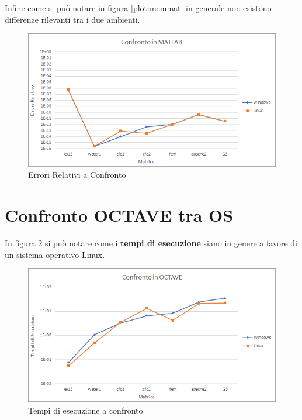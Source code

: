 \documentclass[a4paper,12pt,titlepage,oneside]{book}
\begin{document}
    \newpage
    \noindent Infine come si può notare in figura \ref{plot:memmat} in generale non esistono differenze rilevanti tra i due ambienti.\\[0.5cm]
    
    \begin{figure}[ht]
        \centering
        \includegraphics[scale=0.8]{src/plot/ErrMAT.png}
        \caption{Errori Relativi a Confronto}
        \label{plot:errmat}
    \end{figure}
    
    \newpage
    \section{Confronto OCTAVE tra OS}
    \noindent In figura \ref{plot:timeoct} si può notare come i \textbf{tempi di esecuzione} siano in genere a favore di un sistema operativo Linux.
    
    \begin{figure}[ht]
        \centering
        \includegraphics[scale=0.8]{src/plot/TimeOCT.png}
        \caption{Tempi di esecuzione a confronto}
        \label{plot:timeoct}
    \end{figure}
    
\end{document}

